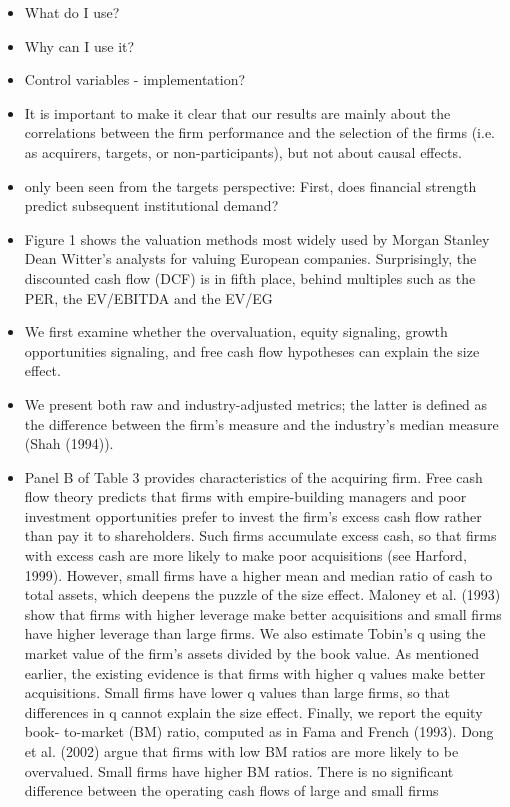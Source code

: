 \documentclass[12pt]{article}
\begin{document}
    \begin{itemize}
            \item What do I use? 
            \item Why can I use it?
            \item Control variables - implementation?

            \item It is important to make it clear that our results are mainly about the correlations between the firm performance and the selection of the firms (i.e. as acquirers, targets, or non-participants), but not about causal effects. \citep{Liu2013}

            \item only been seen from the targets perspective: First, does financial strength predict subsequent institutional demand? \citep{Choi2012}

            \item Figure 1 shows the valuation methods most widely used by Morgan Stanley Dean Witter’s analysts for valuing European companies. Surprisingly, the discounted cash flow (DCF) is in fifth place, behind multiples such as the PER, the EV/EBITDA and the EV/EG \citep{Fernandez2001}

            \item We first examine whether the overvaluation, equity signaling, growth opportunities signaling, and free cash flow hypotheses can explain the size effect. \citep{Moeller2004}

            \item We present both raw and industry-adjusted metrics; the latter is defined as the difference between the firm’s measure and the industry’s median measure (Shah (1994)). \citep{Klein2009}

            \item Panel B of Table 3 provides characteristics of the acquiring firm. Free cash flow theory predicts that firms with empire-building managers and poor investment opportunities prefer to invest the firm’s excess cash flow rather than pay it to shareholders. Such firms accumulate excess cash, so that firms with excess cash are more likely to make poor acquisitions (see Harford, 1999). However, small firms have a higher mean and median ratio of cash to total assets, which deepens the puzzle of the size effect. Maloney et al. (1993) show that firms with higher leverage make better acquisitions and small firms have higher leverage than large firms. We also estimate Tobin’s q using the market value of the firm’s assets divided by the book value. As mentioned earlier, the existing evidence is that firms with higher q values make better acquisitions. Small firms have lower q values than large firms, so that differences in q cannot explain the size effect. Finally, we report the equity book- to-market (BM) ratio, computed as in Fama and French (1993). Dong et al. (2002) argue that firms with low BM ratios are more likely to be overvalued. Small firms have higher BM ratios. There is no significant difference between the operating cash flows of large and small firms \citep{Moeller2004}

        \end{itemize}
\end{document}
